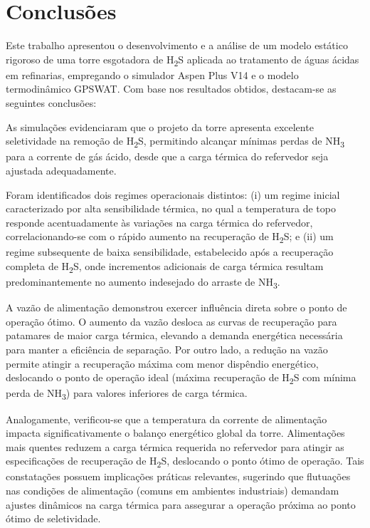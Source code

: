 \documentclass[10pt,a4paper]{article}
\begin{document}
\section{Conclusões}\label{sec:conclusoes}

Este trabalho apresentou o desenvolvimento e a análise de um modelo estático rigoroso de uma torre esgotadora de H\textsubscript{2}S aplicada ao tratamento de águas ácidas em refinarias, empregando o simulador Aspen Plus V14 e o modelo termodinâmico GPSWAT. Com base nos resultados obtidos, destacam-se as seguintes conclusões:

As simulações evidenciaram que o projeto da torre apresenta excelente seletividade na remoção de H\textsubscript{2}S, permitindo alcançar mínimas perdas de NH\textsubscript{3} para a corrente de gás ácido, desde que a carga térmica do refervedor seja ajustada adequadamente.

Foram identificados dois regimes operacionais distintos: (i) um regime inicial caracterizado por alta sensibilidade térmica, no qual a temperatura de topo responde acentuadamente às variações na carga térmica do refervedor, correlacionando-se com o rápido aumento na recuperação de H\textsubscript{2}S; e (ii) um regime subsequente de baixa sensibilidade, estabelecido após a recuperação completa de H\textsubscript{2}S, onde incrementos adicionais de carga térmica resultam predominantemente no aumento indesejado do arraste de NH\textsubscript{3}.

A vazão de alimentação demonstrou exercer influência direta sobre o ponto de operação ótimo. O aumento da vazão desloca as curvas de recuperação para patamares de maior carga térmica, elevando a demanda energética necessária para manter a eficiência de separação. Por outro lado, a redução na vazão permite atingir a recuperação máxima com menor dispêndio energético, deslocando o ponto de operação ideal (máxima recuperação de H\textsubscript{2}S com mínima perda de NH\textsubscript{3}) para valores inferiores de carga térmica.

Analogamente, verificou-se que a temperatura da corrente de alimentação impacta significativamente o balanço energético global da torre. Alimentações mais quentes reduzem a carga térmica requerida no refervedor para atingir as especificações de recuperação de H\textsubscript{2}S, deslocando o ponto ótimo de operação. Tais constatações possuem implicações práticas relevantes, sugerindo que flutuações nas condições de alimentação (comuns em ambientes industriais) demandam ajustes dinâmicos na carga térmica para assegurar a operação próxima ao ponto ótimo de seletividade.
\end{document}

